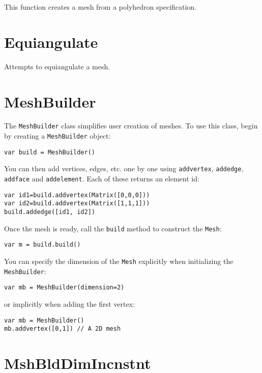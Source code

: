 This function creates a mesh from a polyhedron specification.

\hypertarget{equiangulate}{%
\section{Equiangulate}\label{equiangulate}}

Attempts to equiangulate a mesh.

\hypertarget{meshbuilder}{%
\section{MeshBuilder}\label{meshbuilder}}

The \texttt{MeshBuilder} class simplifies user creation of meshes. To
use this class, begin by creating a \texttt{MeshBuilder} object:

\begin{lstlisting}
var build = MeshBuilder()
\end{lstlisting}

You can then add vertices, edges, etc. one by one using
\texttt{addvertex}, \texttt{addedge}, \texttt{addface} and
\texttt{addelement}. Each of these returns an element id:

\begin{lstlisting}
var id1=build.addvertex(Matrix([0,0,0]))
var id2=build.addvertex(Matrix([1,1,1]))
build.addedge([id1, id2])
\end{lstlisting}

Once the mesh is ready, call the \texttt{build} method to construct the
\texttt{Mesh}:

\begin{lstlisting}
var m = build.build()
\end{lstlisting}

You can specify the dimension of the \texttt{Mesh} explicitly when
initializing the \texttt{MeshBuilder}:

\begin{lstlisting}
var mb = MeshBuilder(dimension=2)
\end{lstlisting}

or implicitly when adding the first vertex:

\begin{lstlisting}
var mb = MeshBuilder() 
mb.addvertex([0,1]) // A 2D mesh
\end{lstlisting}

\hypertarget{mshblddimincnstnt}{%
\section{MshBldDimIncnstnt}\label{mshblddimincnstnt}}

